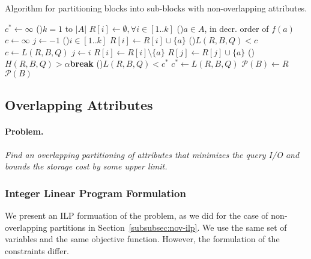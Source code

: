\begin{algorithm}[ht]
\scriptsize
\caption{Algorithm for partitioning blocks into sub-blocks with non-overlapping attributes.}
\label{alg:non-overlappingP}
$c^*\leftarrow \infty$ 
\For(){$k=1$ to $|A|$}{
   $R[i]\leftarrow \emptyset, \forall i\in [1..k]$ 
   \For(){$a \in A$\textnormal{, in decr.\/ order of }$f(a)$}{
      $c\leftarrow \infty$   
      $j\leftarrow -1$ 
      \For(){$i\in [1..k]$} {
         $R[i]\leftarrow R[i] \cup \{a\}$
         \If(){$L(R, B, Q)<c$}{
            $c\leftarrow L(R, B, Q)$
            $j\leftarrow i$
         }
         $R[i]\leftarrow R[i] \setminus \{a\}$
      }
      $R[j]\leftarrow R[j] \cup \{a\}$
   }
   \lIf(){$H(R, B, Q)>\alpha$}{\textbf{break}}
   \If(){$L(R, B, Q)<c^*$}{
     $c^* \leftarrow L(R, B, Q)$
     $\mathcal{P}(B)\leftarrow R$
   } 
}
\Return $\mathcal{P}(B)$ 
\end{algorithm} 

\clearpage
\newpage
\subsection{Overlapping Attributes}

\paragraph*{Problem.$\,$} \emph{Find an overlapping partitioning of attributes
that minimizes the query I/O and bounds the storage cost by some upper
limit.}

\subsubsection{Integer Linear Program Formulation}
We present an ILP formuation of the problem, as we did for the case of
non-overlapping partitions in Section~\ref{subsubsec:nov-ilp}. We use the same
set of variables and the same objective function. However, the formulation of
the constraints differ. 

